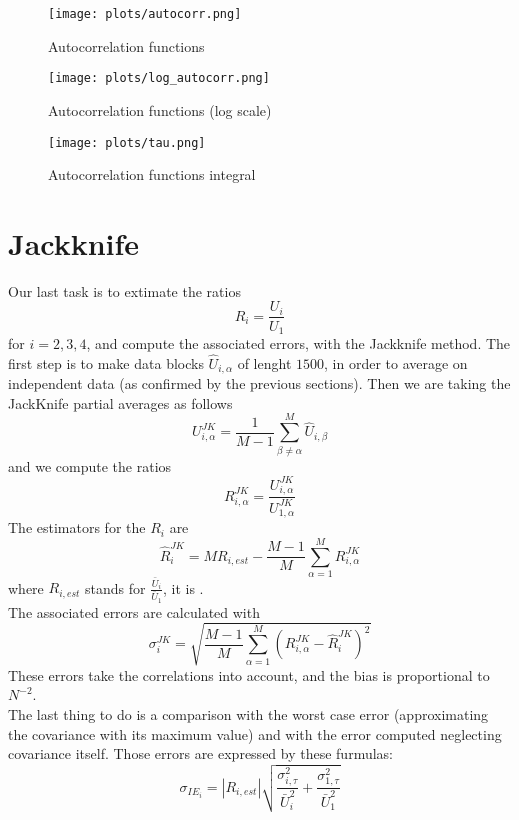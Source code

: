 \documentclass{article}
\begin{document}
\begin{figure}[t]
\centering
\texttt{[image: plots/autocorr.png]}%
\caption{Autocorrelation functions}%
\texttt{[image: plots/log\_autocorr.png]}
\caption{Autocorrelation functions (log scale)}
\end{figure}
\begin{figure}[t]
\centering
\texttt{[image: plots/tau.png]}
\caption{Autocorrelation functions integral}
\end{figure}

\newpage
\section{Jackknife}
Our last task is to extimate the ratios
\begin{equation}
    R_i=\frac{U_i}{U_1}
\end{equation}
for $i=2,3,4$, and compute the associated errors, with the Jackknife method. The first step is to
make data blocks $\hat U_{i,\alpha}$ of lenght $1500$, in order to average on independent data (as confirmed by the
previous sections). Then we are taking the JackKnife partial averages as follows
\begin{equation}
    U_{i,\alpha}^{JK}=\frac{1}{M-1}\sum_{\beta \ne \alpha}^{M}\hat U_{i,\beta}
\end{equation}
and we compute the ratios
\begin{equation}
    R_{i,\alpha}^{JK}=\frac{U_{i,\alpha}^{JK}}{U_{1,\alpha}^{JK}}
\end{equation}
The estimators for the $R_i$ are
\begin{equation}
    \hat {R}_i^{JK}= MR_{i,est}-\frac{M-1}{M}\sum_{\alpha=1}^{M}R_{i,\alpha}^{JK}
\end{equation}
where $R_{i,est}$ stands for $\frac{\bar U_i}{\bar U_1}$, it is .\\
The associated errors are calculated with
\begin{equation}
    \sigma_i^{JK}=\sqrt{\frac{M-1}{M}\sum_{\alpha=1}^{M}(R_{i,\alpha}^{JK}-\hat {R}_i^{JK})^2}
\end{equation}
These errors take the correlations into account, and the bias is proportional to $N^{-2}$.\\
The last thing to do is a comparison with the worst case error (approximating the covariance
with its maximum value) and with the error computed neglecting covariance itself.
Those errors are expressed by these furmulas:
\begin{equation}
\sigma_{IE_i}=\left|R_{i,est}\right|\sqrt{\frac{\sigma_{i,\tau}^2}{\bar U_i ^2} + \frac{\sigma_{1,\tau}^2}{\bar U_1 ^2}}
\end{equation}
\end{document}

